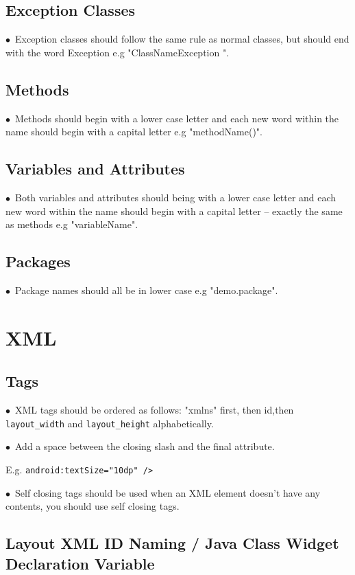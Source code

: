 \documentclass[english]{article}
\begin{document}
				\subsection{Exception Classes}
$\bullet$\ Exception classes should follow the same rule as normal classes, but should end with the word Exception e.g "ClassNameException ".\par
\subsection{Methods}
$\bullet$\ Methods should begin with a lower case letter and each new word within the name should begin with a capital letter e.g "methodName()".\par
\subsection{Variables and Attributes }
$\bullet$\ Both variables and attributes should being with a lower case letter and each new word within the name should begin with a capital letter – exactly the same as methods e.g "variableName".\par
\subsection{Packages}
$\bullet$\ Package names should all be in lower case e.g "demo.package".\par

	\section{XML	}
	
	\subsection{Tags}
$\bullet$\ XML tags should be ordered as follows: "xmlns" first, then id,then  \texttt{layout\_width} and  \texttt{layout\_height} alphabetically. \par
$\bullet$\ Add a space between the closing slash and the final attribute.\par E.g.  \texttt{android:textSize="10dp" /> }\par
$\bullet$\ Self closing tags should be used when an XML element doesn't have any contents, you should use self closing tags. \par

\subsection{Layout XML ID Naming / Java Class Widget Declaration Variable}
				
\end{document}
